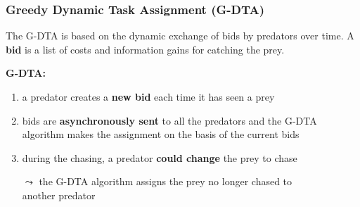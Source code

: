 \begin{frame}
	\frametitle{Greedy Dynamic Task Assignment (G-DTA)}
	
	\vspace{0.4cm}
	
	The G-DTA is based on the dynamic exchange of bids by predators over time. A \textbf{bid}
	is a list of costs and information gains for catching the prey.
	
	\vspace{0.4cm}
	
	\textbf{G-DTA:}
	
	\begin{enumerate}
		\item a predator creates a \textbf{new bid} each time it has seen a prey
		\item bids are \textbf{asynchronously sent} to all the predators and the G-DTA
			  algorithm makes the assignment on the basis of the current bids
		\item during the chasing, a predator \textbf{could change} the prey to chase
			  \begin{tabbing}
			  	  \hspace*{0.1cm}
			  	  
			  	  $ \leadsto $ the G-DTA algorithm assigns the prey no longer chased to\\
				  \hspace*{0.6cm}
			  	  another predator
			  \end{tabbing}
	\end{enumerate}
\end{frame}

